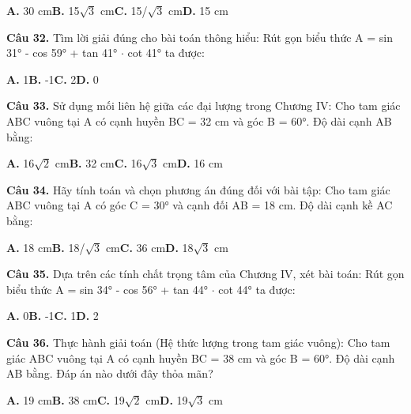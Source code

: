 \documentclass[11pt,a4paper]{article}
\begin{document}
\hspace*{1.5em}\textbf{A.} 30 cm\quad\quad \textbf{B.} 15$\sqrt{3}$ cm\quad\quad \textbf{C.} 15/$\sqrt{3}$ cm\quad\quad \textbf{D.} 15 cm\par\vspace{2pt}
\textbf{\color{primary} Câu 32.} Tìm lời giải đúng cho bài toán thông hiểu: Rút gọn biểu thức A = sin 31° - cos 59° + tan 41° $\cdot$ cot 41° ta được:\par
\hspace*{1.5em}\textbf{A.} 1\quad\quad \textbf{B.} -1\quad\quad \textbf{C.} 2\quad\quad \textbf{D.} 0\par\vspace{2pt}
\textbf{\color{primary} Câu 33.} Sử dụng mối liên hệ giữa các đại lượng trong Chương IV: Cho tam giác ABC vuông tại A có cạnh huyền BC = 32 cm và góc B = 60°. Độ dài cạnh AB bằng:\par
\hspace*{1.5em}\textbf{A.} 16$\sqrt{2}$ cm\quad\quad \textbf{B.} 32 cm\quad\quad \textbf{C.} 16$\sqrt{3}$ cm\quad\quad \textbf{D.} 16 cm\par\vspace{2pt}
\textbf{\color{primary} Câu 34.} Hãy tính toán và chọn phương án đúng đối với bài tập: Cho tam giác ABC vuông tại A có góc C = 30° và cạnh đối AB = 18 cm. Độ dài cạnh kề AC bằng:\par
\hspace*{1.5em}\textbf{A.} 18 cm\quad\quad \textbf{B.} 18/$\sqrt{3}$ cm\quad\quad \textbf{C.} 36 cm\quad\quad \textbf{D.} 18$\sqrt{3}$ cm\par\vspace{2pt}
\textbf{\color{primary} Câu 35.} Dựa trên các tính chất trọng tâm của Chương IV, xét bài toán: Rút gọn biểu thức A = sin 34° - cos 56° + tan 44° $\cdot$ cot 44° ta được:\par
\hspace*{1.5em}\textbf{A.} 0\quad\quad \textbf{B.} -1\quad\quad \textbf{C.} 1\quad\quad \textbf{D.} 2\par\vspace{2pt}
\textbf{\color{primary} Câu 36.} Thực hành giải toán (Hệ thức lượng trong tam giác vuông): Cho tam giác ABC vuông tại A có cạnh huyền BC = 38 cm và góc B = 60°. Độ dài cạnh AB bằng. Đáp án nào dưới đây thỏa mãn?\par
\hspace*{1.5em}\textbf{A.} 19 cm\quad\quad \textbf{B.} 38 cm\quad\quad \textbf{C.} 19$\sqrt{2}$ cm\quad\quad \textbf{D.} 19$\sqrt{3}$ cm\par\vspace{2pt}
\end{document}
